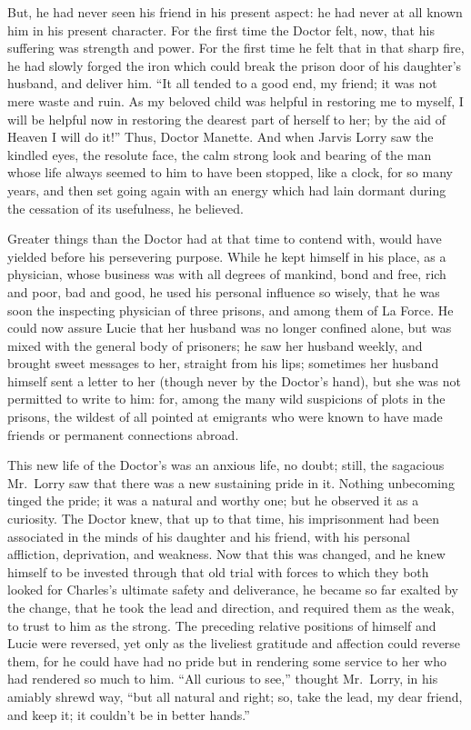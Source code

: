 But, he had never seen his friend in his present aspect:  he had never
at all known him in his present character.  For the first time the
Doctor felt, now, that his suffering was strength and power.  For the
first time he felt that in that sharp fire, he had slowly forged the
iron which could break the prison door of his daughter's husband, and
deliver him.  ``It all tended to a good end, my friend; it was not
mere waste and ruin.  As my beloved child was helpful in restoring me
to myself, I will be helpful now in restoring the dearest part of
herself to her; by the aid of Heaven I will do it!''  Thus, Doctor
Manette.  And when Jarvis Lorry saw the kindled eyes, the resolute
face, the calm strong look and bearing of the man whose life always
seemed to him to have been stopped, like a clock, for so many years,
and then set going again with an energy which had lain dormant during
the cessation of its usefulness, he believed.

Greater things than the Doctor had at that time to contend with,
would have yielded before his persevering purpose.  While he kept
himself in his place, as a physician, whose business was with all
degrees of mankind, bond and free, rich and poor, bad and good, he
used his personal influence so wisely, that he was soon the inspecting
physician of three prisons, and among them of La Force.  He could now
assure Lucie that her husband was no longer confined alone, but was
mixed with the general body of prisoners; he saw her husband weekly,
and brought sweet messages to her, straight from his lips; sometimes
her husband himself sent a letter to her (though never by the Doctor's
hand), but she was not permitted to write to him:  for, among the many
wild suspicions of plots in the prisons, the wildest of all pointed
at emigrants who were known to have made friends or permanent
connections abroad.

This new life of the Doctor's was an anxious life, no doubt; still,
the sagacious Mr.\ Lorry saw that there was a new sustaining pride in it.
Nothing unbecoming tinged the pride; it was a natural and worthy one;
but he observed it as a curiosity.  The Doctor knew, that up to that
time, his imprisonment had been associated in the minds of his
daughter and his friend, with his personal affliction, deprivation,
and weakness.  Now that this was changed, and he knew himself to be
invested through that old trial with forces to which they both looked
for Charles's ultimate safety and deliverance, he became so far exalted
by the change, that he took the lead and direction, and required them
as the weak, to trust to him as the strong.  The preceding relative
positions of himself and Lucie were reversed, yet only as the
liveliest gratitude and affection could reverse them, for he could
have had no pride but in rendering some service to her who had
rendered so much to him.  ``All curious to see,'' thought Mr.\ Lorry,
in his amiably shrewd way, ``but all natural and right; so, take the
lead, my dear friend, and keep it; it couldn't be in better hands.''


